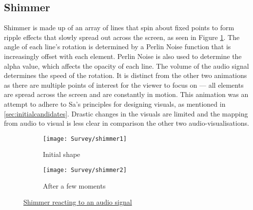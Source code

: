 \documentclass[../initial_thesis.tex]{subfiles}
\begin{document}
\subsection{Shimmer}
Shimmer is made up of an array of lines that spin about fixed points to form ripple effects that slowly spread out across the screen, as seen in Figure \ref{fig:shimmer1}. The angle of each line's rotation is determined by a Perlin Noise function that is increasingly offset with each element. Perlin Noise is also used to determine the alpha value, which affects the opacity of each line. The volume of the audio signal determines the speed of the rotation. It is distinct from the other two animations as there are multiple points of interest for the viewer to focus on --- all elements are spread across the screen and are constantly in motion. This animation was an attempt to adhere to Sa's principles for designing visuals, as mentioned in \ref{sec:initialcandidates}. Drastic changes in the visuals are limited and the mapping from audio to visual is less clear in comparison the other two audio-visualisations.

\begin{figure}
  \begin{subfigure}{0.5\textwidth}
    \texttt{[image: Survey/shimmer1]}
    \caption{Initial shape}
  \end{subfigure} 
  \begin{subfigure}{0.5\textwidth}
    \texttt{[image: Survey/shimmer2]}
    \caption{After a few moments}
  \end{subfigure}
  \caption{\href{https://youtu.be/40OoNjl2jPE}{Shimmer reacting to an audio signal}}
  \label{fig:shimmer1}
\end{figure}
\end{document}
